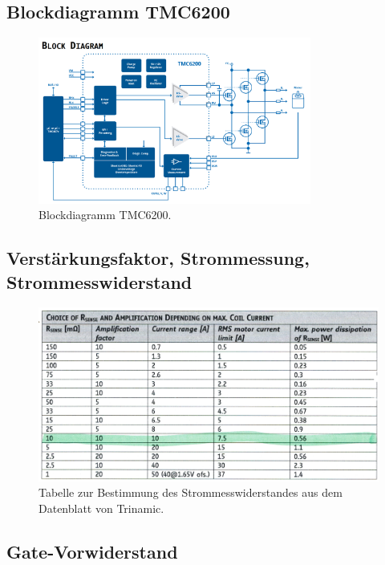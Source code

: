\begin{appendix}
\subsection{Blockdiagramm TMC6200}

\begin{figure}[h!]
	\centering
	\includegraphics[width=0.8\textwidth]{graphics/Blockdiagramm_TMC6200.png}
	\caption{Blockdiagramm TMC6200.}
	\label{fig:Blockdiagramm_TMC6200}
\end{figure}

\newpage

\subsection{Verstärkungsfaktor, Strommessung, Strommesswiderstand}

\begin{figure}[h!]
	\centering
	\includegraphics[width=\textwidth]{graphics/Tabelle_Shunts.png}
	\caption{Tabelle zur Bestimmung des Strommesswiderstandes aus dem Datenblatt von Trinamic.}
	\label{fig:Tabelle_Shunts}
\end{figure}

\subsection{Gate-Vorwiderstand}


\end{appendix}
